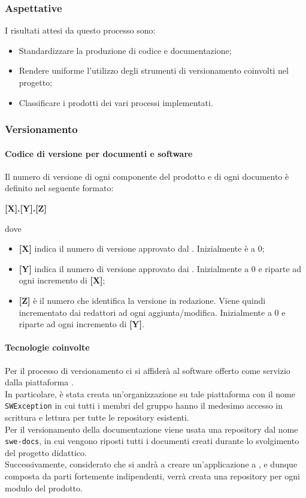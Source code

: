 \subsubsection{Aspettative}
I risultati attesi da questo processo sono:
\begin{itemize}
    \item Standardizzare la produzione di codice e documentazione;
    \item Rendere uniforme l'utilizzo degli strumenti di versionamento coinvolti nel progetto;
    \item Classificare i prodotti dei vari processi implementati.
\end{itemize}

\subsubsection{Versionamento}
\paragraph{Codice di versione per documenti e software}
Il numero di versione di ogni componente del prodotto e di ogni documento è definito nel seguente formato:
\begin{center}
    \textbf{[X].[Y].[Z]}
\end{center}
dove
\begin{itemize}
    \item \textbf{[X]} indica il numero di versione approvato dal . Inizialmente è a 0;
    \item \textbf{[Y]} indica il numero di versione approvato dai . Inizialmente a 0 e riparte ad ogni
                       incremento di \textbf{[X]};
    \item \textbf{[Z]} è il numero che identifica la versione in redazione. Viene quindi incrementato dai redattori
                       ad ogni aggiunta/modifica. Inizialmente a 0 e riparte ad ogni incremento di \textbf{[Y]}.
\end{itemize}

\paragraph{Tecnologie coinvolte}
Per il processo di versionamento ci si affiderà al software  offerto come servizio dalla piattaforma .\\
In particolare, è stata creata un'organizzazione su tale piattaforma con il nome \verb|SWException| in cui tutti i membri del gruppo
hanno il medesimo accesso in scrittura e lettura per tutte le repository esistenti.\\
Per il versionamento della documentazione viene usata una repository dal nome \verb|swe-docs|, in cui vengono riposti tutti i
documenti creati durante lo svolgimento del progetto didattico.\\
Successivamente,  considerato che si andrà a creare un'applicazione a , e dunque composta da parti fortemente indipendenti,
verrà creata una repository per ogni modulo del prodotto.

